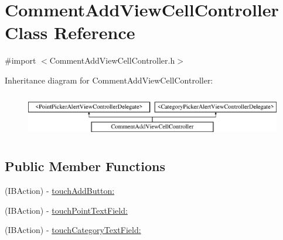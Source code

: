 \hypertarget{interface_comment_add_view_cell_controller}{
\section{CommentAddViewCellController Class Reference}
\label{interface_comment_add_view_cell_controller}
}


{\ttfamily \#import $<$CommentAddViewCellController.h$>$}

Inheritance diagram for CommentAddViewCellController:\begin{figure}[H]
\begin{center}
\leavevmode
\includegraphics[height=1.978799cm]{interface_comment_add_view_cell_controller}
\end{center}
\end{figure}
\subsection*{Public Member Functions}
\begin{DoxyCompactItemize}
\item 
(IBAction) -\/ \hyperlink{interface_comment_add_view_cell_controller_afe532e3d7df727964275d2ac91060ccb}{touchAddButton:}
\item 
(IBAction) -\/ \hyperlink{interface_comment_add_view_cell_controller_a513ed5171ca3b8ff13b6fff41d16882c}{touchPointTextField:}
\item 
(IBAction) -\/ \hyperlink{interface_comment_add_view_cell_controller_a9e404058ea5227904b4289b616dfe307}{touchCategoryTextField:}
\end{DoxyCompactItemize}
